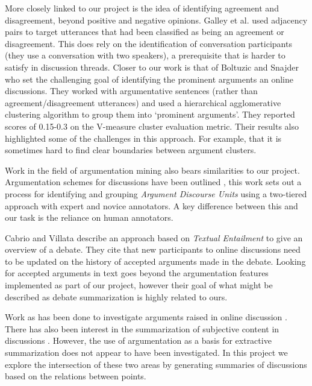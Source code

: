     More closely linked to our project is the idea of identifying agreement and disagreement, beyond positive and negative opinions. Galley et al. \cite{galley2004identifying} used adjacency pairs to target utterances that had been classified as being an agreement or disagreement. This does rely on the identification of conversation participants (they use a conversation with two speakers), a prerequisite that is harder to satisfy in discussion threads. Closer to our work is that of Boltuzic and Snajder \cite{boltuzic2015identifying} who set the challenging goal of identifying the prominent arguments an online discussions. They worked with argumentative sentences (rather than agreement/disagreement utterances) and used a hierarchical agglomerative clustering algorithm to group them into `prominent arguments'. They reported scores of 0.15-0.3 on the V-measure cluster evaluation metric. Their results also highlighted some of the challenges in this approach. For example, that it is sometimes hard to find clear boundaries between argument clusters.

    Work in the field of argumentation mining also bears similarities to our project. Argumentation schemes for discussions have been outlined \cite{ghosh2014analyzing}, this work sets out a process for identifying and grouping \textit{Argument Discourse Units} using a two-tiered approach with expert and novice annotators. A key difference between this and our task is the reliance on human annotators.

    Cabrio and Villata \cite{cabrio2012combining} describe an approach based on \textit{Textual Entailment} to give an overview of a debate. They cite that new participants to online discussions need to be updated on the history of accepted arguments made in the debate. Looking for accepted arguments in text goes beyond the argumentation features implemented as part of our project, however their goal of what might be described as debate summarization is highly related to ours.

    Work as has been done to investigate arguments raised in online discussion \cite{boltuzic2015identifying,cabrio2012combining,ghosh2014analyzing}. There has also been interest in the summarization of subjective content in discussions \cite{hu2004mining,lloret2009towards,galley2004identifying}. However, the use of argumentation as a basis for extractive summarization does not appear to have been investigated. In this project we explore the intersection of these two areas by generating summaries of discussions based on the relations between points.
